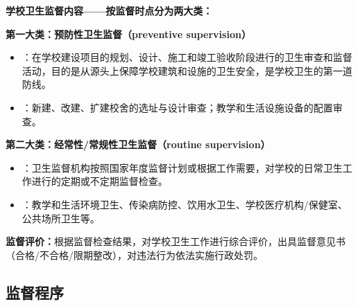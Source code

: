 \begin{defbox}
\textbf{学校卫生监督内容——按监督时点分为两大类：}

\textbf{第一大类：预防性卫生监督（preventive supervision）}
\begin{itemize}[leftmargin=*]
    \item {}：在学校建设项目的规划、设计、施工和竣工验收阶段进行的卫生审查和监督活动，目的是从源头上保障学校建筑和设施的卫生安全，是学校卫生的第一道防线。
    \item {}：新建、改建、扩建校舍的选址与设计审查；教学和生活设施设备的配置审查。
\end{itemize}

\textbf{第二大类：经常性/常规性卫生监督（routine supervision）}
\begin{itemize}[leftmargin=*]
    \item {}：卫生监督机构按照国家年度监督计划或根据工作需要，对学校的日常卫生工作进行的定期或不定期监督检查。
    \item {}：教学和生活环境卫生、传染病防控、饮用水卫生、学校医疗机构/保健室、公共场所卫生等。
\end{itemize}

\textbf{监督评价：}根据监督检查结果，对学校卫生工作进行综合评价，出具监督意见书（合格/不合格/限期整改），对违法行为依法实施行政处罚。
\end{defbox}

\subsection{监督程序}

